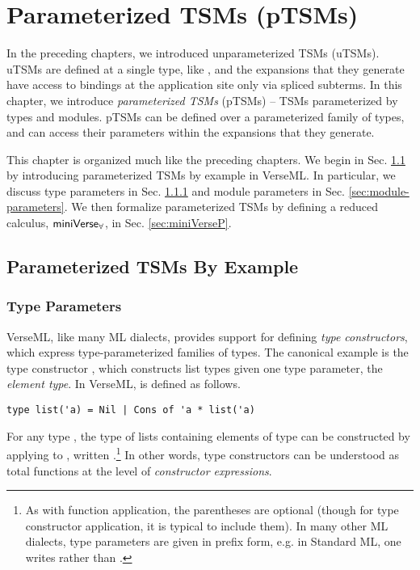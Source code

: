 
\chapter{Parameterized TSMs (pTSMs)}\label{chap:ptsms}
In the preceding chapters, we introduced unparameterized TSMs (uTSMs). uTSMs are defined at a single type, like , and the expansions that they generate have access to bindings at the application site only via spliced subterms. In this chapter, we introduce \emph{parameterized TSMs} (pTSMs) -- TSMs parameterized by types and modules. pTSMs can be defined over a parameterized family of types, and can access their parameters within the expansions that they generate. 

This chapter is organized much like the preceding chapters. We begin in Sec. \ref{sec:parameterized-tsms-by-example} by introducing parameterized TSMs by example in VerseML. In particular, we discuss type parameters in Sec. \ref{sec:type-parameters} and module parameters in Sec. \ref{sec:module-parameters}. We then formalize parameterized TSMs by defining a reduced calculus, $\mathsf{miniVerse}_\mathbf{\forall}$, in Sec. \ref{sec:miniVerseP}.
\section{Parameterized TSMs By Example}\label{sec:parameterized-tsms-by-example}

\subsection{Type Parameters}\label{sec:type-parameters}
VerseML, like many ML dialects, provides support for defining \emph{type constructors}, which express type-parameterized families of types. The canonical example is the type constructor , which constructs list types given one type parameter, the \emph{element type}. 
In VerseML,  is defined as follows.
\begin{lstlisting}[numbers=none]
type list('a) = Nil | Cons of 'a * list('a)
\end{lstlisting}

For any type , the type of lists containing elements of type  can be constructed by applying  to , written .\footnote{As with function application, the parentheses are optional (though for type constructor application, it is typical to include them). In many other ML dialects, type parameters are given in prefix form, e.g. in Standard ML, one writes  rather than .} In other words, type constructors can be understood as total functions at the level of \emph{constructor expressions}. 

